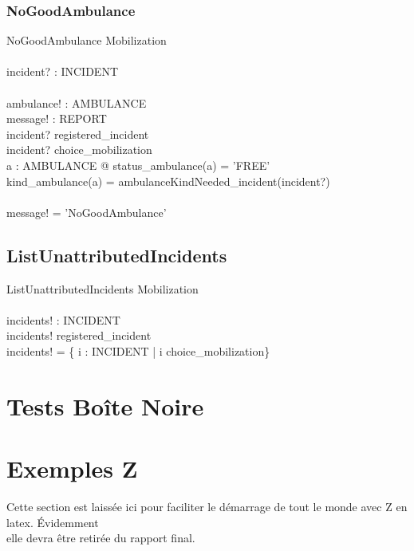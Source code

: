 \documentclass[12pt]{article}
\begin{document}
\subsubsection{NoGoodAmbulance}

\begin{schema}{NoGoodAmbulance}
	\Xi Mobilization		\\
	\newline				\\
	incident? : INCIDENT	\\
	\newline				\\
	ambulance! : AMBULANCE	\\
	message! : REPORT		\\
  \where
	incident? \in registered\_incident \\
	incident? \notin \ran choice\_mobilization \\
	\not \exists a : AMBULANCE @ status\_ambulance(a) = 'FREE' \land \\
	 kind\_ambulance(a) = ambulanceKindNeeded\_incident(incident?) \\
	\newline \\
	message! = 'NoGoodAmbulance'
\end{schema}

\subsection{ListUnattributedIncidents}

\begin{schema}{ListUnattributedIncidents}
	\Xi Mobilization		\\
	\newline				\\
	incidents! : \power INCIDENT \\
  \where
	incidents! \subseteq registered\_incident \\
	incidents! = \{ i : INCIDENT | i \notin \ran choice\_mobilization\}
\end{schema}

\section{Tests Boîte Noire}



\section{Exemples Z}
Cette section est laissée ici pour faciliter le démarrage de tout le monde avec Z en latex.  Évidemment\\ elle devra être retirée du rapport final.
\end{document}
